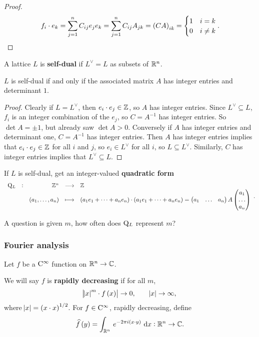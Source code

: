 \begin{proof}
$$ f_i \cdot e_k = \sum_{j = 1}^n C_{ij}e_je_k = \sum_{j = 1}^n C_{ij}A_{jk} = \br{CA}_{ik} =
\begin{cases}
1 & i = k \\
0 & i \ne k
\end{cases}.
$$
\end{proof}

\begin{definition}
A lattice $ L $ is \textbf{self-dual} if $ L^\vee = L $ as subsets of $ \mathbb{R}^n $.
\end{definition}

\begin{proposition}
$ L $ is self-dual if and only if the associated matrix $ A $ has integer entries and determinant $ 1 $.
\end{proposition}

\begin{proof}
Clearly if $ L = L^\vee $, then $ e_i \cdot e_j \in \mathbb{Z} $, so $ A $ has integer entries. Since $ L^\vee \subseteq L $, $ f_i $ is an integer combination of the $ e_j $, so $ C = A^{-1} $ has integer entries. So $ \det A = \pm 1 $, but already saw $ \det A > 0 $. Conversely if $ A $ has integer entries and determinant one, $ C = A^{-1} $ has integer entries. Then $ A $ has integer entries implies that $ e_i \cdot e_j \in \mathbb{Z} $ for all $ i $ and $ j $, so $ e_i \in L^\vee $ for all $ i $, so $ L \subseteq L^\vee $. Similarly, $ C $ has integer entries implies that $ L^\vee \subseteq L $.
\end{proof}

If $ L $ is self-dual, get an integer-valued \textbf{quadratic form}
$$ \function[\Q_L]{\ZZ^n}{\ZZ}{\br{a_1, \dots, a_n}}{\br{a_1e_1 + \dots + a_ne_n} \cdot \br{a_1e_1 + \dots + a_ne_n} = \onebythree{a_1}{\dots}{a_n}A\threebyone{a_1}{\dots}{a_n}}. $$

A question is given $ m $, how often does $ \mathrm{Q}_L $ represent $ m $?

\pagebreak

\subsubsection{Fourier analysis}


Let $ f $ be a $ \mathrm{C}^\infty $ function on $ \mathbb{R}^n \to \mathbb{C} $.

\begin{definition}
We will say $ f $ is \textbf{rapidly decreasing} if for all $ m $,
$$ \abs{\abs{x}^m \cdot f\br{x}} \to 0, \qquad \abs{x} \to \infty, $$
where $ \abs{x} = \br{x \cdot x}^{1 / 2} $. For $ f \in \mathrm{C}^\infty $, rapidly decreasing, define
$$ \widehat{f}\br{y} = \intd{\RR^n}{}{e^{-2\pi i\br{x \cdot y}}}{x} : \RR^n \to \CC. $$
\end{definition}

